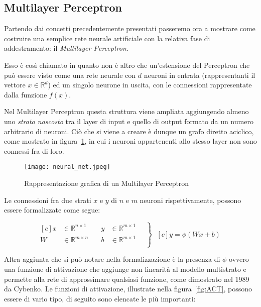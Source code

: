 \subsection{Multilayer Perceptron}
\label{subsec:mlp}

Partendo dai concetti precedentemente presentati passeremo ora a mostrare come costruire una semplice rete neurale artificiale con la relativa fase di addestramento: il \textit{Multilayer Perceptron}.\par
Esso è così chiamato in quanto non è altro che un'estensione del Perceptron che può essere visto come una rete neurale con $d$ neuroni in entrata (rappresentanti il vettore $x \in \mathbb{R}^d$) ed un singolo neurone in uscita, con le connessioni rappresentate dalla funzione $f(x)$.\par

Nel Multilayer Perceptron questa struttura viene ampliata aggiungendo almeno uno \textit{strato nascosto} tra il layer di input e quello di output formato da un numero arbitrario di neuroni.
Ciò che si viene a creare è dunque un grafo diretto aciclico, come mostrato in figura~\ref{fig:MLP}, in cui i neuroni appartenenti allo stesso layer non sono connessi fra di loro.

\begin{figure}[H]
	\centering
	\texttt{[image: neural\_net.jpeg]}
	\caption{Rappresentazione grafica di un Multilayer Perceptron}
\label{fig:MLP}
\end{figure}

Le connessioni fra due strati $x$ e $y$ di $n$ e $m$ neuroni rispettivamente, possono essere formalizzate come segue:

\begin{equation*}
	\left.\begin{aligned}[c]
		x &\in \mathbb{R}^{n \times 1} &\quad 
		y &\in \mathbb{R}^{m \times 1} \\
		W &\in \mathbb{R}^{m \times n} &\quad
		b &\in \mathbb{R}^{m \times 1} \\
	\end{aligned}\quad \right\}
	\;
	\begin{aligned}[c]
		y = \phi(Wx + b)
	\end{aligned}
\end{equation*}

Altra aggiunta che si può notare nella formalizzazione è la presenza di $\phi$ ovvero una funzione di attivazione che aggiunge non linearità al modello multistrato e permette alla rete di approssimare qualsiasi funzione, come dimostrato nel 1989 da Cybenko\cite{Cybenko1989}.
Le funzioni di attivazione, illustrate nella figura~\ref{fig:ACT}, possono essere di vario tipo, di seguito sono elencate le più importanti:


